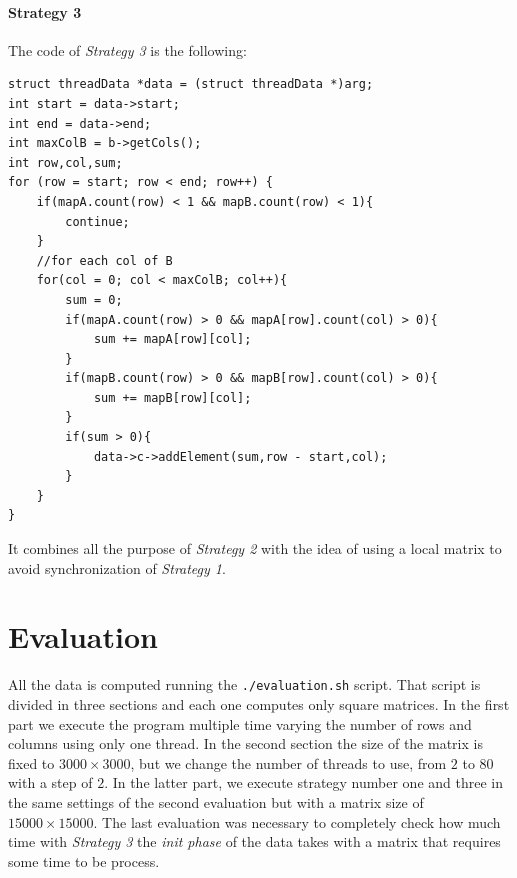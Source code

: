 \documentclass[]{article}
\begin{document}
\paragraph{Strategy 3}
The code of \textit{Strategy 3} is the following:
\begin{lstlisting}[style=customc]
struct threadData *data = (struct threadData *)arg;
int start = data->start;
int end = data->end;
int maxColB = b->getCols();
int row,col,sum;
for (row = start; row < end; row++) {
    if(mapA.count(row) < 1 && mapB.count(row) < 1){
        continue;
    }
    //for each col of B
    for(col = 0; col < maxColB; col++){
        sum = 0;
        if(mapA.count(row) > 0 && mapA[row].count(col) > 0){
            sum += mapA[row][col];
        }
        if(mapB.count(row) > 0 && mapB[row].count(col) > 0){
            sum += mapB[row][col];
        }
        if(sum > 0){
            data->c->addElement(sum,row - start,col);
        }
    }
}
\end{lstlisting}
It combines all the purpose of \textit{Strategy 2} with the idea of using a local matrix to avoid synchronization of \textit{Strategy 1}.

\label{evaluation}
\section{Evaluation}
All the data is computed running the  \texttt{./evaluation.sh} script.
That script is divided in three sections and each one computes only square matrices.
In the first part we execute the program multiple time varying the number of rows and columns using only one thread.
In the second section the size of the matrix is fixed to $3000\times 3000$, but we change the number of threads to use, from $2$ to $80$ with a step of $2$.
In the latter part, we execute strategy number one and three in the same settings of the second evaluation but with a matrix size of $15000\times 15000$. 
The last evaluation was necessary to completely check how much time with \textit{Strategy 3} the \textit{init phase} of the data takes with a matrix that requires some time to be process.
\newpage
\end{document}
